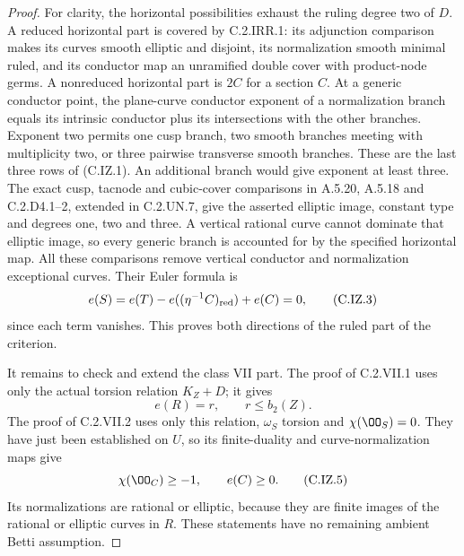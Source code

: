 \begin{proof}
For clarity, the horizontal possibilities exhaust the
ruling degree two of $D$. A reduced horizontal part is
covered by C.2.IRR.1: its adjunction comparison makes its
curves smooth elliptic and disjoint, its normalization
smooth minimal ruled, and its conductor map an unramified
double cover with product-node germs. A nonreduced
horizontal part is $2C$ for a section $C$. At a generic
conductor point, the plane-curve conductor exponent of a
normalization branch equals its intrinsic conductor plus
its intersections with the other branches. Exponent two
permits one cusp branch, two smooth branches meeting with
multiplicity two, or three pairwise transverse smooth
branches. These are the last three rows of (C.IZ.1).
An additional branch would give exponent at least three.
The exact cusp, tacnode and cubic-cover comparisons in
A.5.20, A.5.18 and C.2.D4.1--2, extended in C.2.UN.7,
give the asserted elliptic image, constant type and
degrees one, two and three. A vertical rational curve
cannot dominate that elliptic image, so every generic
branch is accounted for by the specified horizontal map.
All these comparisons remove vertical conductor and
normalization exceptional curves. Their Euler formula is
\[
 e(S)=e(T)-e((\eta^{-1}C)_{\rm red})+e(C)=0,             \tag{C.IZ.3}
\]
since each term vanishes. This proves both directions of
the ruled part of the criterion.

It remains to check and extend the class VII part. The
proof of C.2.VII.1 uses only the actual torsion relation
$K_Z+D$; it gives
\[
 e(R)=r,\qquad r\le b_2(Z).                              \tag{C.IZ.4}
\]
The proof of C.2.VII.2 uses only this relation,
$\omega_S$ torsion and $\chi(\OO_S)=0$. They have just
been established on $U$, so its finite-duality and
curve-normalization maps give
\[
 \chi(\OO_C)\ge-1,\qquad e(C)\ge0.                      \tag{C.IZ.5}
\]
Its normalizations are rational or elliptic, because they
are finite images of the rational or elliptic curves in
$R$. These statements have no remaining ambient Betti
assumption.


\end{proof}
